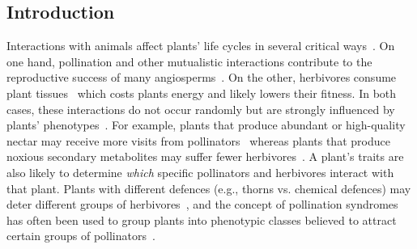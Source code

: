 \documentclass[12pt]{article}
\begin{document}
\begin{spacing}{1.5}

\section*{Introduction}
\linenumbers

  Interactions with animals affect plants' life cycles in several critical
  ways~\citep{Mayr2001,Sauve2016}. On one hand,
  pollination and other mutualistic interactions contribute
  to the reproductive success of many angiosperms~\citep{Ollerton2011}. 
  On the other, herbivores consume plant tissues~\citep{McCall2006} which
  costs plants energy and likely lowers their fitness.
  In both cases, these interactions do not occur randomly but
  are strongly influenced by plants' phenotypes~\citep{Fontaine2015}. 
  For example, plants that 
  produce abundant or high-quality nectar may receive more visits from
  pollinators~\citep{Robertson1999} whereas plants that produce noxious 
  secondary metabolites may suffer fewer herbivores~\citep{Johnson2014}. 
  A plant's traits are also likely to determine \emph{which} specific pollinators 
  and herbivores interact with that plant. Plants with different defences 
  (e.g., thorns vs. chemical defences) may deter different groups of 
  herbivores~\citep{Ehrlich1964,Johnson2014}, and the concept of 
  pollination syndromes has often been used to group plants into phenotypic
  classes believed to attract certain groups of pollinators~\citep{Waser1996,Fenster2004,Ollerton2009}.



\end{spacing}
\end{document}

